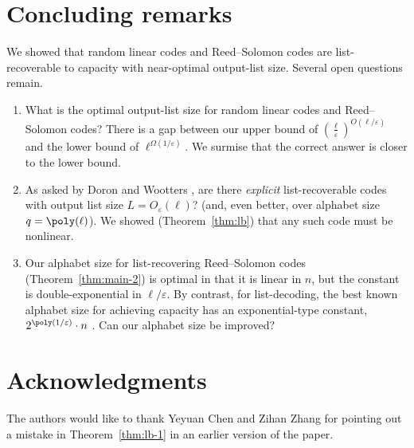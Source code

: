 \documentclass{article}
\begin{document}
\section{Concluding remarks}

We showed that random linear codes and Reed--Solomon codes are list-recoverable to capacity with near-optimal output-list size. Several open questions remain.
\begin{enumerate}
    \item What is the optimal output-list size for random linear codes and Reed--Solomon codes? There is a gap between our upper bound of $(\frac{\ell}{\varepsilon})^{O(\ell/\varepsilon)}$ and the lower bound of $\ell^{\Omega(1/\varepsilon)}$. We surmise that the correct answer is closer to the lower bound.

    \item As asked by Doron and Wootters \cite{doron2020highprobability}, are there \emph{explicit} list-recoverable codes with output list size $L=O_\varepsilon(\ell)$? (and, even better, over alphabet size $q=\poly(\ell)$). We showed (Theorem~\ref{thm:lb}) that any such code must be nonlinear.
    
    \item Our alphabet size for list-recovering Reed--Solomon codes (Theorem~\ref{thm:main-2}) is optimal in that it is linear in $n$, but the constant is double-exponential in $\ell/\varepsilon$. By contrast, for list-decoding, the best known alphabet size for achieving capacity has an exponential-type constant, $2^{\poly (1/\varepsilon)} \cdot n$ \cite{AGL24}. Can our alphabet size be improved?
\end{enumerate}

\section{Acknowledgments}
The authors would like to thank Yeyuan Chen and Zihan Zhang for pointing out a mistake in Theorem~\ref{thm:lb-1} in an earlier version of the paper.
\clearpage
\printbibliography
\end{document}
